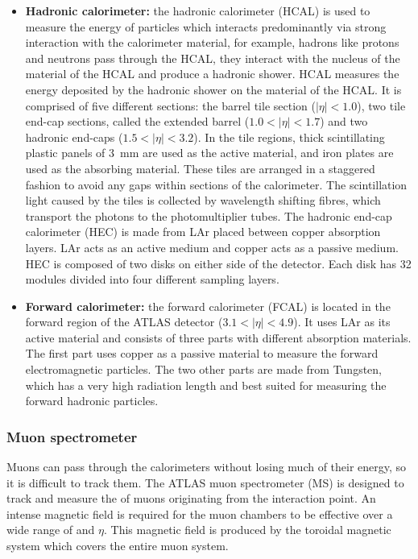 \begin{itemize}
	\item \textbf{Hadronic calorimeter:} the hadronic calorimeter (HCAL) is used to measure the energy of particles which interacts predominantly via strong interaction with the calorimeter material, for example, hadrons like protons and neutrons pass through the HCAL, they interact with the nucleus of the material of the HCAL and produce a hadronic shower. HCAL measures the energy deposited by the hadronic shower on the material of the HCAL. It is comprised of five different sections: the barrel tile section ($|\eta|<1.0$), two tile end-cap sections, called the extended barrel ($1.0<|\eta|<1.7$) and two hadronic end-caps ($1.5<|\eta|<3.2$). In the tile regions, thick scintillating plastic panels of \SI{3}{\milli\meter} are used as the active material, and iron plates are used as the absorbing material. These tiles are arranged in a staggered fashion to avoid any gaps within sections of the calorimeter. The scintillation light caused by the tiles is collected by wavelength shifting fibres, which transport the photons to the photomultiplier tubes. The hadronic end-cap calorimeter (HEC) is made from LAr placed between copper absorption layers. LAr acts as an active medium and copper acts as a passive medium. HEC is composed of two disks on either side of the detector. Each disk has 32 modules divided into four different sampling layers.~\cite{atlas}
	
	\item \textbf{Forward calorimeter:} the forward calorimeter (FCAL) is located in the forward region of the ATLAS detector ($3.1<|\eta|<4.9$). It uses LAr as its active material and consists of three parts with different absorption materials. The first part uses copper as a passive material to measure the forward electromagnetic particles. The two other parts are made from Tungsten, which has a very high radiation length and best suited for measuring the forward hadronic particles.~\cite{atlas}
\end{itemize}
 
\subsubsection{Muon spectrometer}%
\label{sec:lhcandatlas:atlas:muonspectrometer}
Muons can pass through the calorimeters without losing much of their energy, so it is difficult to track them. The ATLAS muon spectrometer (MS) is designed to track and measure the \pt of muons originating from the interaction point. An intense magnetic field is required for the muon chambers to be effective over a wide range of \pt and $\eta$. This magnetic field is produced by the toroidal magnetic system which covers the entire muon system.

